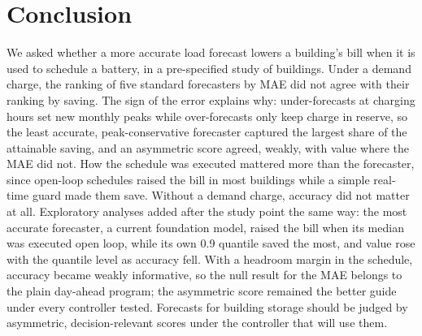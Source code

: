 \section{Conclusion}\label{sec:conclusion}

We asked whether a more accurate load forecast lowers a building's bill when it is used to schedule a battery, in a pre-specified study of  buildings. Under a demand charge, the ranking of five standard forecasters by MAE did not agree with their ranking by saving. The sign of the error explains why: under-forecasts at charging hours set new monthly peaks while over-forecasts only keep charge in reserve, so the least accurate, peak-conservative forecaster captured the largest share of the attainable saving, and an asymmetric score agreed, weakly, with value where the MAE did not. How the schedule was executed mattered more than the forecaster, since open-loop schedules raised the bill in most buildings while a simple real-time guard made them save. Without a demand charge, accuracy did not matter at all. Exploratory analyses added after the study point the same way: the most accurate forecaster, a current foundation model, raised the bill when its median was executed open loop, while its own 0.9 quantile saved the most, and value rose with the quantile level as accuracy fell. With a headroom margin in the schedule, accuracy became weakly informative, so the null result for the MAE belongs to the plain day-ahead program; the asymmetric score remained the better guide under every controller tested. Forecasts for building storage should be judged by asymmetric, decision-relevant scores under the controller that will use them.
